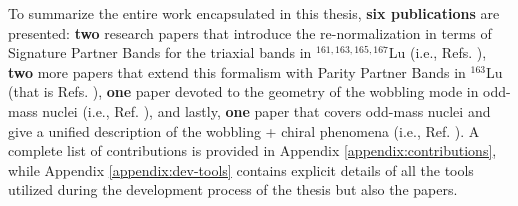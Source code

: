 To summarize the entire work encapsulated in this thesis, \textbf{six publications} are presented: \textbf{two} research papers that introduce the re-normalization in terms of Signature Partner Bands for the triaxial bands in $^{161,163,165,167}$Lu (i.e., Refs. \cite{raduta2020approach,raduta2020towards}), \textbf{two} more papers that extend this formalism with Parity Partner Bands in $^{163}$Lu (that is Refs. \cite{poenaru2021parity,poenaru2021extensive1}), \textbf{one} paper devoted to the geometry of the wobbling mode in odd-mass nuclei (i.e., Ref. \cite{poenaru2021extensive2}), and lastly, \textbf{one} paper that covers odd-mass nuclei and give a unified description of the wobbling + chiral phenomena (i.e., Ref. \cite{raduta2020new}). A complete list of contributions is provided in Appendix \ref{appendix:contributions}, while Appendix \ref{appendix:dev-tools} contains explicit details of all the tools utilized during the development process of the thesis but also the papers.
